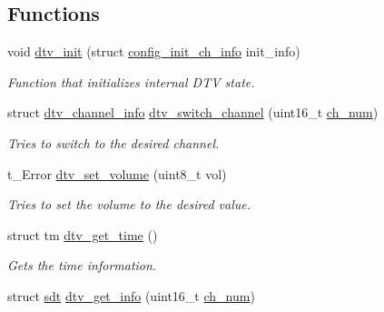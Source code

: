 \subsection*{Functions}
\begin{DoxyCompactItemize}
\item 
void \hyperlink{group__dtv_ga7da3a709e8d58fa00ee48687c5bf26a7}{dtv\+\_\+init} (struct \hyperlink{structconfig__init__ch__info}{config\+\_\+init\+\_\+ch\+\_\+info} init\+\_\+info)\hypertarget{group__dtv_ga7da3a709e8d58fa00ee48687c5bf26a7}{}\label{group__dtv_ga7da3a709e8d58fa00ee48687c5bf26a7}

\begin{DoxyCompactList}\small\item\em Function that initializes internal D\+TV state. \end{DoxyCompactList}\item 
struct \hyperlink{structdtv__channel__info}{dtv\+\_\+channel\+\_\+info} \hyperlink{group__dtv_gaadc265544bf474e6847f614d8a6d438e}{dtv\+\_\+switch\+\_\+channel} (uint16\+\_\+t \hyperlink{structures_8h_abcdde739cb26f5c6c2c0b87e83d1f421}{ch\+\_\+num})\hypertarget{group__dtv_gaadc265544bf474e6847f614d8a6d438e}{}\label{group__dtv_gaadc265544bf474e6847f614d8a6d438e}

\begin{DoxyCompactList}\small\item\em Tries to switch to the desired channel. \end{DoxyCompactList}\item 
t\+\_\+\+Error \hyperlink{group__dtv_gaa7f54804b10abbefca93d03afdc5aaab}{dtv\+\_\+set\+\_\+volume} (uint8\+\_\+t vol)
\begin{DoxyCompactList}\small\item\em Tries to set the volume to the desired value. \end{DoxyCompactList}\item 
struct tm \hyperlink{group__dtv_ga999f0d08fc5ddc8d4d781ccbfe10218e}{dtv\+\_\+get\+\_\+time} ()\hypertarget{group__dtv_ga999f0d08fc5ddc8d4d781ccbfe10218e}{}\label{group__dtv_ga999f0d08fc5ddc8d4d781ccbfe10218e}

\begin{DoxyCompactList}\small\item\em Gets the time information. \end{DoxyCompactList}\item 
struct \hyperlink{structsdt}{sdt} \hyperlink{group__dtv_ga3b7df96e66fac38b64c96e703d65e710}{dtv\+\_\+get\+\_\+info} (uint16\+\_\+t \hyperlink{structures_8h_abcdde739cb26f5c6c2c0b87e83d1f421}{ch\+\_\+num})\hypertarget{group__dtv_ga3b7df96e66fac38b64c96e703d65e710}{}\label{group__dtv_ga3b7df96e66fac38b64c96e703d65e710}


\end{DoxyCompactItemize}
